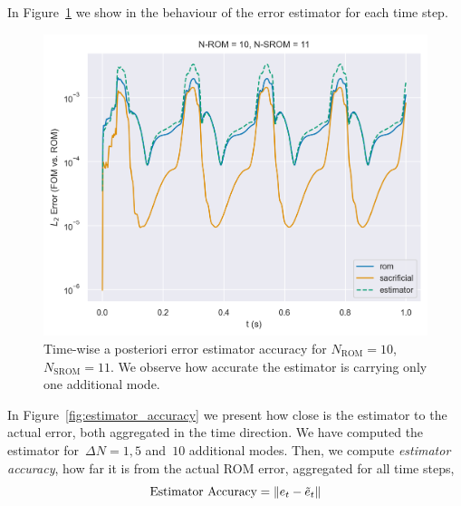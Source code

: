 \documentclass[../../thesis.tex]{subfiles}
\begin{document}
In Figure~\ref{fig:estimator_accuracy_timewise} we show in the behaviour of the error estimator 
for each time step.
\begin{figure}[h]
    \centering
    \includegraphics[width=1\columnwidth]{research_project/piston/figures/rb_certification/error_estimation_rom_10_srom_11.png}
    \caption{Time-wise a posteriori error estimator accuracy for $N_{\text{ROM}} = 10$, $N_{\text{SROM}} = 11$.
    We observe how accurate the estimator is carrying only one additional mode.}
    \label{fig:estimator_accuracy_timewise}
\end{figure}
In Figure~\ref{fig:estimator_accuracy} we present how close is the estimator to the actual error,
both aggregated in the time direction.
We have computed the estimator for~\mbox{$\Delta N = 1, 5$} and~$10$ additional modes.
Then, we compute \textit{estimator accuracy}, how far it is from the actual ROM error,
aggregated for all time steps, 
\begin{equation}
    \text{Estimator Accuracy} = \norm{e_t - \tilde{e}_t} 
\end{equation}
\end{document}
